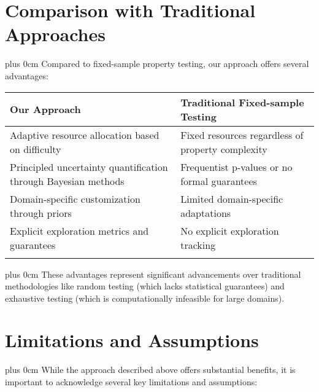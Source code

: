 \documentclass[conference]{IEEEtran}
\newcommand{\justifytext}{\leftskip=0pt \rightskip=0pt plus 0cm}
\newcommand{\tabletitlecolor}{blue!70!black}
\newcommand{\tableheader}[1]{\cellcolor{tablerow1}\textbf{\large #1}}
\begin{document}
\section{Comparison with Traditional Approaches}

\justifytext
Compared to fixed-sample property testing, our approach offers several advantages:

\begin{tcolorbox}[
  enhanced,
  colback=white,
  colframe=\tabletitlecolor,
  arc=0mm,
  boxrule=0.5pt,
  left=0pt,
  right=0pt,
  top=2pt,
  bottom=2pt,
  boxsep=0pt,
  width=\textwidth
]
\vspace{1mm}
\begin{tabularx}{\textwidth}{>{\raggedright\arraybackslash}X|>{\raggedright\arraybackslash}X}
\tableheader{Our Approach} & \tableheader{Traditional Fixed-sample Testing} \\
\hline
\addlinespace[3pt]
Adaptive resource allocation based on difficulty & 
Fixed resources regardless of property complexity \\
\addlinespace[3pt]
\hline
\addlinespace[3pt]

Principled uncertainty quantification through Bayesian methods & 
Frequentist p-values or no formal guarantees \\
\addlinespace[3pt]
\hline
\addlinespace[3pt]

Domain-specific customization through priors & 
Limited domain-specific adaptations \\
\addlinespace[3pt]
\hline
\addlinespace[3pt]

Explicit exploration metrics and guarantees & 
No explicit exploration tracking \\
\addlinespace[3pt]
\end{tabularx}
\vspace{1mm}
\end{tcolorbox}

\justifytext
These advantages represent significant advancements over traditional methodologies like random testing (which lacks statistical guarantees) and exhaustive testing (which is computationally infeasible for large domains).

\section{Limitations and Assumptions}

\justifytext
While the approach described above offers substantial benefits, it is important to acknowledge several key limitations and assumptions:
\end{document}
